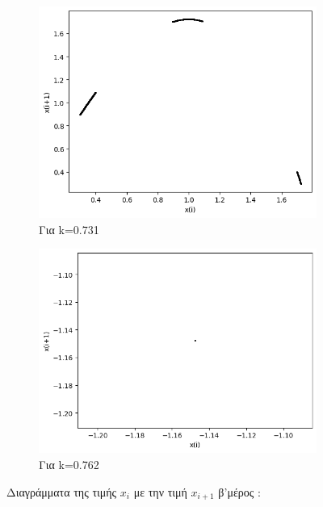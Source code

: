 \begin{figure}[h!]
\begin{subfigure}[b]{0.4\textwidth}
		\includegraphics[width=\textwidth]{LateX images/graphs q12/g11}
		\caption{Για k=0.731}
		\label{f:k67}
	\end{subfigure}
	\hfill
	\begin{subfigure}[b]{0.4\textwidth}
		\centering
		\includegraphics[width=\textwidth]{LateX images/graphs q12/g12}
		\caption{Για k=0.762}
		\label{f:k68}
	\end{subfigure}
	\hfill
\caption{Διαγράμματα της τιμής \(x_i\) με την τιμή \(x_{i+1}\) β'μέρος :}	
\end{figure}

\clearpage

